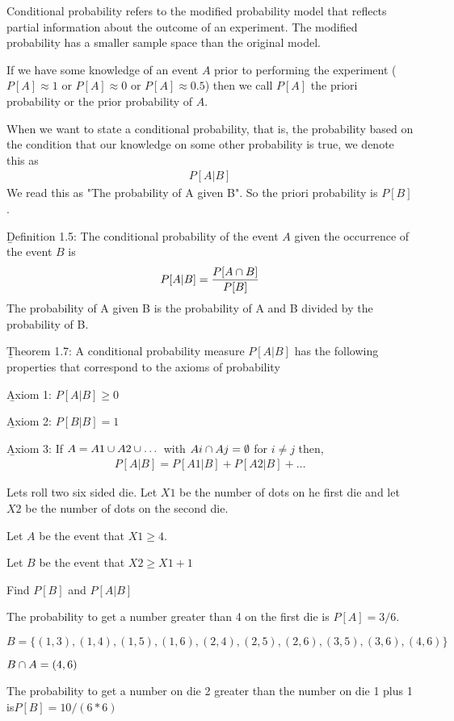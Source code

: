 \documentclass[12pt, titlepage, oneside]{article}
\begin{document}
Conditional probability refers to the modified probability model that reflects partial information about the outcome of an experiment. The modified probability has a smaller sample space than the original model.

If we have some knowledge of an event $A$ prior to performing the experiment ($P[A]\approx 1$ or $P[A] \approx 0$ or $P[A]\approx 0.5$) then we call $P[A]$ the priori probability or the prior probability of $A$. 

When we want to state a conditional probability, that is, the probability based on the condition that our knowledge on some other probability is true, we denote this as
\begin{align}
P[A|B]
\end{align}
We read this as "The probability of A given B". So the priori probability is $P[B]$.

\b{Definition 1.5}: The conditional probability of the event $A$ given the occurrence of the event $B$ is 
\begin{align}
P[A|B] =  \frac{P[A \cap B]}{P[B]} 
\end{align}
The probability of A given B is the probability of A and B divided by the probability of B.

\b{Theorem 1.7}: A conditional probability measure $P[A|B]$ has the following properties that correspond to the axioms of probability

\b{Axiom 1}: $P[A|B] \geq 0$

\b{Axiom 2}: $P[B|B] = 1$

\b{Axiom 3}: If $A = A1 \cup A2 \cup \dots $ with $Ai \cap Aj = \emptyset$ for $i \neq j$ then,
\begin{align}
P[A|B] = P[A1|B] + P[A2|B] + \dots
\end{align}

\ex Lets roll two six sided die. Let $X1$ be the number of dots on he first die and let $X2$ be the number of dots on the second die.

Let $A$ be the event that $X1 \geq 4$.

Let $B$ be the event that $X2 \ge X1 + 1$ 

Find $P[B]$ and $P[A|B]$

The probability to get a number greater than 4 on the first die is $P[A] = 3/6$.

$B = \{ (1,3), (1,4), (1,5), (1,6), (2,4), (2,5), (2,6), (3,5), (3,6), (4,6)\} $

$B \cap A = {(4,6)}$

The probability to get a number on die 2 greater than the number on die 1 plus 1 is$P[B] = 10/(6*6)$
\end{document}
